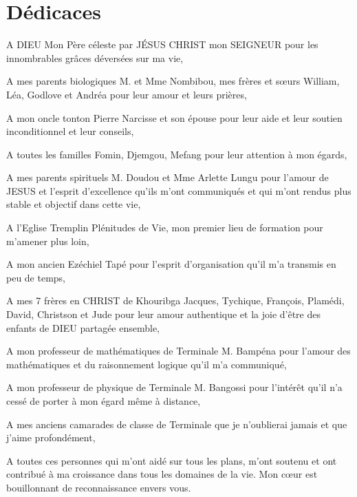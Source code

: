\chapter*{Dédicaces}
A DIEU Mon Père céleste par JÉSUS CHRIST mon SEIGNEUR pour les innombrables grâces déversées sur ma vie,


A mes parents biologiques M. et Mme Nombibou, mes frères et sœurs William, Léa, Godlove et Andréa pour leur amour et leurs prières,


A mon oncle tonton Pierre Narcisse et son épouse pour leur aide et leur soutien inconditionnel et leur conseils,


A toutes les familles Fomin, Djemgou, Mefang pour leur attention à mon égards,


A mes parents spirituels M. Doudou et Mme Arlette Lungu pour l'amour de JESUS et l'esprit d'excellence qu'ils m'ont communiqués et  qui m'ont rendus plus stable et objectif dans cette vie,


A l’Eglise Tremplin Plénitudes de Vie, mon premier lieu de formation pour m'amener plus loin,  


A mon ancien Ezéchiel Tapé pour l’esprit d’organisation qu’il m’a transmis en peu de temps, 


A mes 7 frères en CHRIST de Khouribga Jacques, Tychique, François, Plamédi, David, Christson et Jude pour leur amour authentique et la joie d’être des enfants de DIEU partagée ensemble,


A mon professeur de mathématiques de Terminale M. Bampéna pour l'amour des mathématiques et du raisonnement logique qu'il m'a communiqué,


A mon professeur de physique de Terminale M. Bangossi pour l'intérêt qu’il n’a cessé de porter à mon égard même à distance,


A mes anciens camarades de classe de Terminale que je n'oublierai jamais et que j’aime profondément,


A toutes ces personnes qui m'ont aidé sur tous les plans, m'ont soutenu  et ont contribué à ma croissance dans tous les domaines de la vie. Mon cœur est bouillonnant de reconnaissance envers vous.
